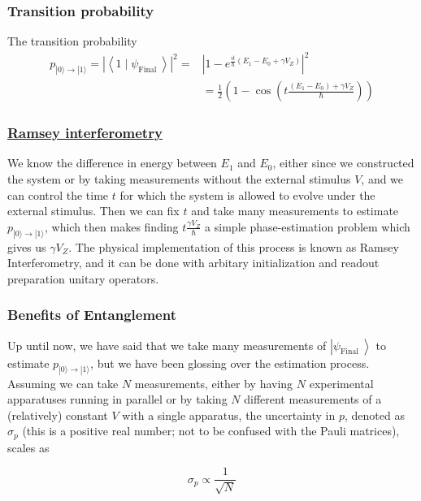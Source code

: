\documentclass{beamer}
\begin{document}
\begin{frame}
\frametitle{Transition probability}

The transition probability
\begin{align*}
p_{|0\rangle \rightarrow|1\rangle}=\left|\left\langle 1 \mid \psi_{\text {Final }}\right\rangle\right|^{2}=&\left|1-e^{\frac{i t}{\hbar}\left(E_{1}-E_{0}+\gamma V_Z\right)}\right|^{2}\\
&=\frac{1}{2}\left(1-\cos \left(t \frac{\left(E_{1}-E_{0}\right)+\gamma V_Z}{\hbar}\right)\right)
\end{align*}
\end{frame}

\begin{frame}
\frametitle{\href{{https://en.wikipedia.org/wiki/Ramsey_interferometry}}{Ramsey interferometry}}

We know the difference in energy between $E_{1}$ and $E_{0}$, either
since we constructed the system or by taking measurements without the
external stimulus $V$, and we can control the time $t$ for which the
system is allowed to evolve under the external stimulus. Then we can
fix $t$ and take many measurements to estimate $p_{|0\rangle
\rightarrow|1\rangle}$, which then makes finding $t \frac{\gamma
V_Z}{\hbar}$ a simple phase-estimation problem which gives us $\gamma
V_Z$. The physical implementation of this process is known as Ramsey
Interferometry, and it can be done with arbitary initialization and
readout preparation unitary operators.
\end{frame}

\begin{frame}
\frametitle{Benefits of Entanglement}

Up until now, we have said that we take many measurements of
$\left|\psi_{\text {Final }}\right\rangle$ to estimate $p_{|0\rangle
\rightarrow|1\rangle}$, but we have been glossing over the estimation
process. Assuming we can take $N$ measurements, either by having $N$
experimental apparatuses running in parallel or by taking $N$
different measurements of a (relatively) constant $V$ with a single
apparatus, the uncertainty in $p$, denoted as $\sigma_{p}$ (this is a
positive real number; not to be confused with the Pauli matrices),
scales as

\[
\sigma_{p} \propto \frac{1}{\sqrt{N}}
\]
\end{frame}
\end{document}

